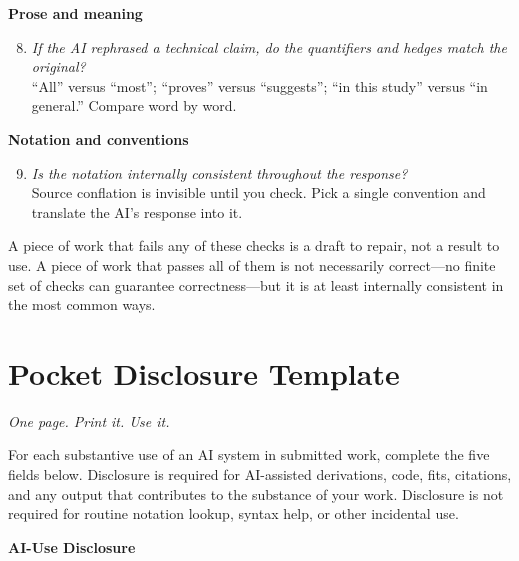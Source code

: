 \documentclass[11pt]{book}
\begin{document}
\medskip

\noindent \textbf{Prose and meaning}

\begin{enumerate}\setcounter{enumi}{7}\setlength{\itemsep}{4pt}
\item \emph{If the AI rephrased a technical claim, do the quantifiers and hedges match the original?}\\
``All'' versus ``most''; ``proves'' versus ``suggests''; ``in this study'' versus ``in general.'' Compare word by word.
\end{enumerate}

\medskip

\noindent \textbf{Notation and conventions}

\begin{enumerate}\setcounter{enumi}{8}\setlength{\itemsep}{4pt}
\item \emph{Is the notation internally consistent throughout the response?}\\
Source conflation is invisible until you check. Pick a single convention and translate the AI's response into it.
\end{enumerate}

\medskip\medskip

\noindent A piece of work that fails any of these checks is a draft to repair, not a result to use. A piece of work that passes all of them is not necessarily correct---no finite set of checks can guarantee correctness---but it is at least internally consistent in the most common ways.

\chapter{Pocket Disclosure Template}
\label{app:disclosure-template}

\noindent \emph{One page. Print it. Use it.}

\medskip

For each substantive use of an AI system in submitted work, complete the five fields below. Disclosure is required for AI-assisted derivations, code, fits, citations, and any output that contributes to the substance of your work. Disclosure is not required for routine notation lookup, syntax help, or other incidental use.

\medskip

\noindent \textbf{AI-Use Disclosure}
\end{document}
